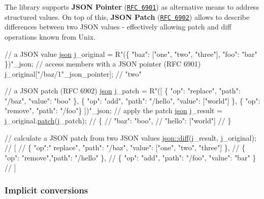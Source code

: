 The library supports {\bfseries J\+S\+ON Pointer} (\href{https://tools.ietf.org/html/rfc6901}{\tt R\+FC 6901}) as alternative means to address structured values. On top of this, {\bfseries J\+S\+ON Patch} (\href{https://tools.ietf.org/html/rfc6902}{\tt R\+FC 6902}) allows to describe differences between two J\+S\+ON values -\/ effectively allowing patch and diff operations known from Unix.


\begin{DoxyCode}
\textcolor{comment}{// a JSON value}
\hyperlink{classnlohmann_1_1basic__json}{json} j\_original = R\textcolor{stringliteral}{"(\{}
\textcolor{stringliteral}{  "baz": ["one", "two", "three"],}
\textcolor{stringliteral}{  "foo": "bar"}
\textcolor{stringliteral}{\})"\_json;}
\textcolor{stringliteral}{}
\textcolor{stringliteral}{}\textcolor{comment}{// access members with a JSON pointer (RFC 6901)}
j\_original[\textcolor{stringliteral}{"/baz/1"}\_json\_pointer];
\textcolor{comment}{// "two"}

\textcolor{comment}{// a JSON patch (RFC 6902)}
\hyperlink{classnlohmann_1_1basic__json}{json} j\_patch = R\textcolor{stringliteral}{"([}
\textcolor{stringliteral}{  \{ "op": "replace", "path": "/baz", "value": "boo" \},}
\textcolor{stringliteral}{  \{ "op": "add", "path": "/hello", "value": ["world"] \},}
\textcolor{stringliteral}{  \{ "op": "remove", "path": "/foo"\}}
\textcolor{stringliteral}{])"\_json;}
\textcolor{stringliteral}{}
\textcolor{stringliteral}{}\textcolor{comment}{// apply the patch}
\hyperlink{classnlohmann_1_1basic__json}{json} j\_result = j\_original.\hyperlink{classnlohmann_1_1basic__json_a81e0c41a4a9dff4df2f6973f7f8b2a83}{patch}(j\_patch);
\textcolor{comment}{// \{}
\textcolor{comment}{//    "baz": "boo",}
\textcolor{comment}{//    "hello": ["world"]}
\textcolor{comment}{// \}}

\textcolor{comment}{// calculate a JSON patch from two JSON values}
\hyperlink{classnlohmann_1_1basic__json_a543bd5f7490de54c875b2c0912dc9a49}{json::diff}(j\_result, j\_original);
\textcolor{comment}{// [}
\textcolor{comment}{//   \{ "op":" replace", "path": "/baz", "value": ["one", "two", "three"] \},}
\textcolor{comment}{//   \{ "op": "remove","path": "/hello" \},}
\textcolor{comment}{//   \{ "op": "add", "path": "/foo", "value": "bar" \}}
\textcolor{comment}{// ]}
\end{DoxyCode}


\subsubsection*{Implicit conversions}

